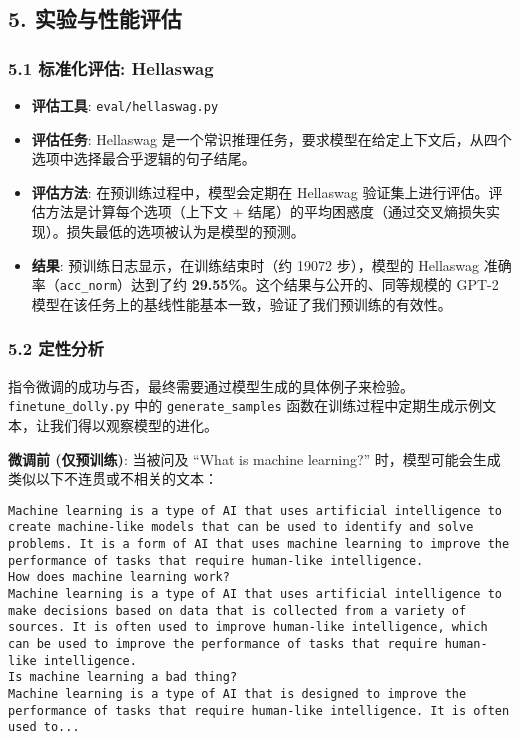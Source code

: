 \documentclass[a4paper]{article}
\providecommand{\tightlist}{%
  \setlength{\itemsep}{0pt}\setlength{\parskip}{0pt}}
\begin{document}
\subsection{5.
实验与性能评估}\label{ux5b9eux9a8cux4e0eux6027ux80fdux8bc4ux4f30}

\subsubsection{5.1 标准化评估:
Hellaswag}\label{ux6807ux51c6ux5316ux8bc4ux4f30-hellaswag}

\begin{itemize}
\tightlist
\item
  \textbf{评估工具}: \texttt{eval/hellaswag.py}
\item
  \textbf{评估任务}: Hellaswag
  是一个常识推理任务，要求模型在给定上下文后，从四个选项中选择最合乎逻辑的句子结尾。
\item
  \textbf{评估方法}: 在预训练过程中，模型会定期在 Hellaswag
  验证集上进行评估。评估方法是计算每个选项（上下文 +
  结尾）的平均困惑度（通过交叉熵损失实现）。损失最低的选项被认为是模型的预测。
\item
  \textbf{结果}: 预训练日志显示，在训练结束时（约 19072 步），模型的
  Hellaswag 准确率（\texttt{acc\_norm}）达到了约
  \textbf{29.55\%}。这个结果与公开的、同等规模的 GPT-2
  模型在该任务上的基线性能基本一致，验证了我们预训练的有效性。
\end{itemize}

\subsubsection{5.2 定性分析}\label{ux5b9aux6027ux5206ux6790}

指令微调的成功与否，最终需要通过模型生成的具体例子来检验。\texttt{finetune\_dolly.py}
中的 \texttt{generate\_samples}
函数在训练过程中定期生成示例文本，让我们得以观察模型的进化。

\textbf{微调前 (仅预训练)}: 当被问及 ``What is machine learning?''
时，模型可能会生成类似以下不连贯或不相关的文本：

\begin{verbatim}
Machine learning is a type of AI that uses artificial intelligence to create machine-like models that can be used to identify and solve problems. It is a form of AI that uses machine learning to improve the performance of tasks that require human-like intelligence.
How does machine learning work?
Machine learning is a type of AI that uses artificial intelligence to make decisions based on data that is collected from a variety of sources. It is often used to improve human-like intelligence, which can be used to improve the performance of tasks that require human-like intelligence.
Is machine learning a bad thing?
Machine learning is a type of AI that is designed to improve the performance of tasks that require human-like intelligence. It is often used to...
\end{verbatim}
\end{document}
